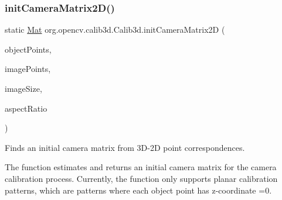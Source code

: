 \mbox{\label{classorg_1_1opencv_1_1calib3d_1_1_calib3d_a15df47d3a4b4a3ef48f13d1c09aae9cb}} 
\subsubsection{\texorpdfstring{init\+Camera\+Matrix2\+D()}{initCameraMatrix2D()}\hspace{0.1cm}{\footnotesize\ttfamily [1/2]}}
{\footnotesize\ttfamily static \mbox{\hyperlink{classorg_1_1opencv_1_1core_1_1_mat}{Mat}} org.\+opencv.\+calib3d.\+Calib3d.\+init\+Camera\+Matrix2D (\begin{DoxyParamCaption}\item[{List$<$ \mbox{\hyperlink{classorg_1_1opencv_1_1core_1_1_mat_of_point3f}{Mat\+Of\+Point3f}} $>$}]{object\+Points,  }\item[{List$<$ \mbox{\hyperlink{classorg_1_1opencv_1_1core_1_1_mat_of_point2f}{Mat\+Of\+Point2f}} $>$}]{image\+Points,  }\item[{\mbox{\hyperlink{classorg_1_1opencv_1_1core_1_1_size}{Size}}}]{image\+Size,  }\item[{double}]{aspect\+Ratio }\end{DoxyParamCaption})\hspace{0.3cm}{\ttfamily [static]}}

Finds an initial camera matrix from 3\+D-\/2D point correspondences.

The function estimates and returns an initial camera matrix for the camera calibration process. Currently, the function only supports planar calibration patterns, which are patterns where each object point has z-\/coordinate =0.



